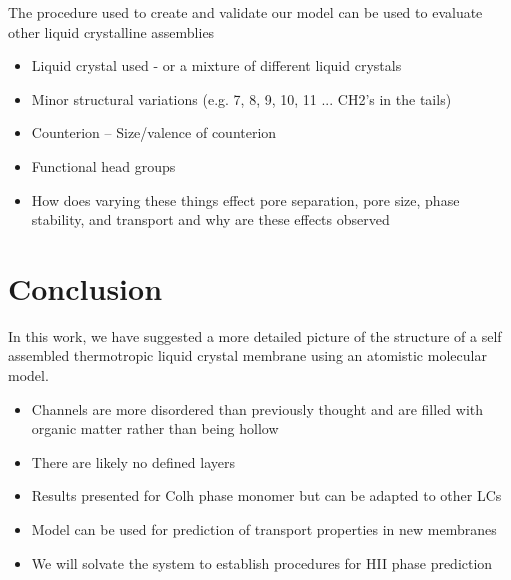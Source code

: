 \documentclass{article}
\begin{document}
	The procedure used to create and validate our model can be used to evaluate other liquid crystalline assemblies
		\begin{itemize}
			\item Liquid crystal used - or a mixture of different liquid crystals
			\item Minor structural variations (e.g. 7, 8, 9, 10, 11 ... CH2's in the tails)
			\item Counterion -- Size/valence of counterion
			\item Functional head groups
			\item How does varying these things effect pore separation, pore size, phase stability, and transport and why are these effects observed
		\end{itemize} 
		
	\section{Conclusion}

	In this work, we have suggested a more detailed picture of the structure of a self assembled thermotropic liquid crystal membrane using an atomistic molecular model.
	\begin{itemize}
		\item Channels are more disordered than previously thought and are filled with organic matter rather than being hollow 
		\item There are likely no defined layers
		\item Results presented for Colh phase monomer but can be adapted to other LCs
		\item Model can be used for prediction of transport properties in new membranes
		\item We will solvate the system to establish procedures for HII phase prediction
	\end{itemize}
\end{document}
